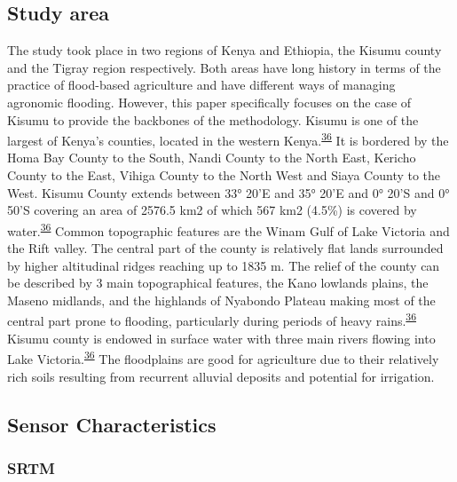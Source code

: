 \documentclass[12pt,oneside]{article}
\begin{document}
\hypertarget{I1}{%
\subsection{Study area}\label{I1}}

The study took place in two regions of Kenya and Ethiopia, the Kisumu county and the Tigray region respectively. Both areas have long history in terms of the practice of flood-based agriculture and have different ways of managing agronomic flooding. However, this paper specifically focuses on the case of Kisumu to provide the backbones of the methodology. Kisumu is one of the largest of Kenya's counties, located in the western Kenya.\textsuperscript{\protect\hyperlink{ref-KisumuCountyGovernment_2013}{36}} It is bordered by the Homa Bay County to the South, Nandi County to the North East, Kericho County to the East, Vihiga County to the North West and Siaya County to the West. Kisumu County extends between 33° 20'E and 35° 20'E and 0° 20'S and 0° 50'S covering an area of 2576.5 km2 of which 567 km2 (4.5\%) is covered by water.\textsuperscript{\protect\hyperlink{ref-KisumuCountyGovernment_2013}{36}} Common topographic features are the Winam Gulf of Lake Victoria and the Rift valley. The central part of the county is relatively flat lands surrounded by higher altitudinal ridges reaching up to 1835 m. The relief of the county can be described by 3 main topographical features, the Kano lowlands plains, the Maseno midlands, and the highlands of Nyabondo Plateau making most of the central part prone to flooding, particularly during periods of heavy rains.\textsuperscript{\protect\hyperlink{ref-KisumuCountyGovernment_2013}{36}} Kisumu county is endowed in surface water with three main rivers flowing into Lake Victoria.\textsuperscript{\protect\hyperlink{ref-KisumuCountyGovernment_2013}{36}} The floodplains are good for agriculture due to their relatively rich soils resulting from recurrent alluvial deposits and potential for irrigation.

\hypertarget{I2}{%
\subsection{Sensor Characteristics}\label{I2}}

\hypertarget{I21}{%
\subsubsection{SRTM}\label{I21}}
\end{document}

